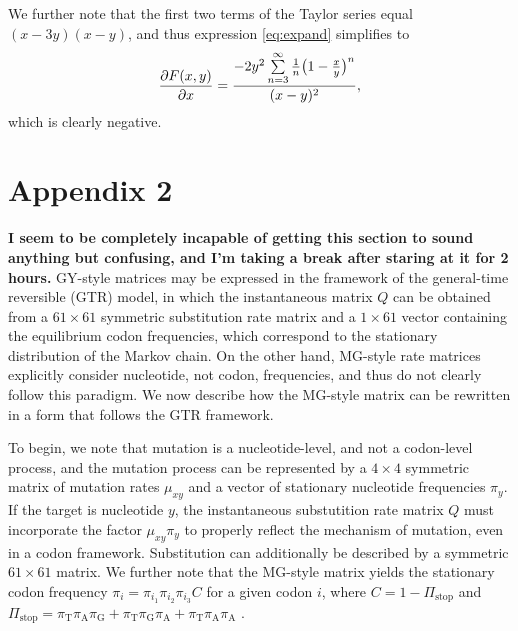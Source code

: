 \documentclass[11pt]{article}
\begin{document}
We further note that the first two terms of the Taylor series equal $(x-3y)(x-y)$, and thus expression \eqref{eq:expand} simplifies to 
\begin{equation}
\frac{\partial{F(x,y)}}{\partial{x}} = \frac{-2y^2\sum\limits_{n=3}^\infty \frac{1}{n} \big{(}1-\frac{x}{y}\big{)}^n}{(x-y)^2} ,
\end{equation}
which is clearly negative. 


\bigskip



\section*{Appendix 2}
\textbf{I seem to be completely incapable of getting this section to sound anything but confusing, and I'm taking a break after staring at it for 2 hours.}
GY-style matrices may be expressed in the framework of the general-time reversible (GTR) model, in which the instantaneous matrix $Q$ can be obtained from a $61 \times 61$ symmetric substitution rate matrix and a $1\times61$ vector containing the equilibrium codon frequencies, which correspond to the stationary distribution of the Markov chain. On the other hand, MG-style rate matrices explicitly consider nucleotide, not codon, frequencies, and thus do not clearly follow this paradigm. We now describe how the MG-style matrix can be rewritten in a form that follows the GTR framework. 

To begin, we note that mutation is a nucleotide-level, and not a codon-level process, and the mutation process can be represented by a $4 \times 4$ symmetric matrix of mutation rates $\mu_{xy}$ and a vector of stationary nucleotide frequencies $\pi_y$. If the target is nucleotide $y$, the instantaneous substutition rate matrix $Q$ must incorporate the factor $\mu_{xy}\pi_y$ to properly reflect the mechanism of mutation, even in a codon framework. Substitution can additionally be described by a symmetric $61\times61$ matrix. We further note that the MG-style matrix yields the stationary codon frequency $\pi_i = \pi_{i_1}\pi_{i_2}\pi_{i_3}C$ for a given codon $i$, where $C = 1 - \Pi_\text{stop}$ and $\Pi_\text{stop} = \pi_\text{T}\pi_\text{A}\pi_\text{G} + \pi_\text{T}\pi_\text{G}\pi_\text{A} + \pi_\text{T}\pi_\text{A}\pi_\text{A}$ \cite{MuseGaut1994}. 
\end{document}
